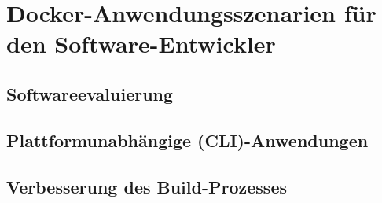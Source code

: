 
\chapter{Docker-Anwendungsszenarien für den Software-Entwickler}
\label{cha:szenarien}


\section{Softwareevaluierung}
\label{sec:softwareevaluierung}
\section{Plattformunabhängige (CLI)-Anwendungen}
\section{Verbesserung des Build-Prozesses}
\label{sec:build-prozess-verbesserung}
